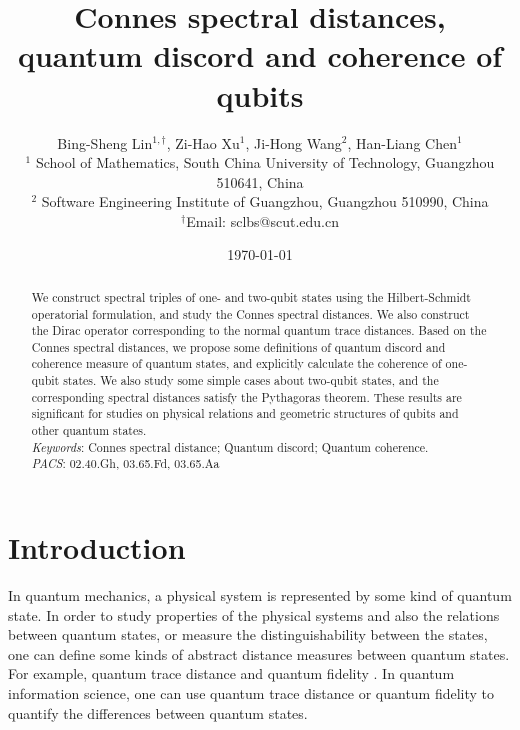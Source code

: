 \documentclass[a4paper,12pt]{article}
\begin{document}
\title{Connes spectral distances, quantum discord and coherence of qubits}

\author{Bing-Sheng Lin$^{1, \dag}$, Zi-Hao Xu$^{1}$, Ji-Hong Wang$^{2}$, Han-Liang Chen$^{1}$\\
\small $^{1}$ School of Mathematics, South China University of Technology,
Guangzhou 510641, China\\
\small $^{2}$ Software Engineering Institute of Guangzhou, Guangzhou 510990, China\\
\small $^{\dag}$Email: sclbs@scut.edu.cn\\
}

\date{\today}

\maketitle

\begin{abstract}
We construct spectral triples of one- and two-qubit states using the Hilbert-Schmidt operatorial formulation, and study the Connes spectral distances.
We also construct the Dirac operator corresponding to the normal quantum trace distances.
Based on the Connes spectral distances, we propose some definitions of quantum discord and coherence measure of quantum states, and explicitly calculate the coherence of one-qubit states.
We also study some simple cases about two-qubit states, and the corresponding spectral distances satisfy the Pythagoras theorem.
These results are significant for studies on physical relations and geometric structures of qubits and other quantum states.
\\


\textit{Keywords}: Connes spectral distance; Quantum discord; Quantum coherence.\\

\textit{PACS}: 02.40.Gh, 03.65.Fd, 03.65.Aa
\end{abstract}



\section{Introduction}
In quantum mechanics, a physical system is represented by some kind of quantum state. In order to study properties of the physical systems and also the relations between quantum states, or measure the distinguishability between the states, one can define some kinds of abstract distance measures between quantum states. For example, quantum trace distance and quantum fidelity \cite{Nielsen}.
In quantum information science, one can use quantum trace distance or quantum fidelity to quantify the differences between quantum states.
\end{document}
